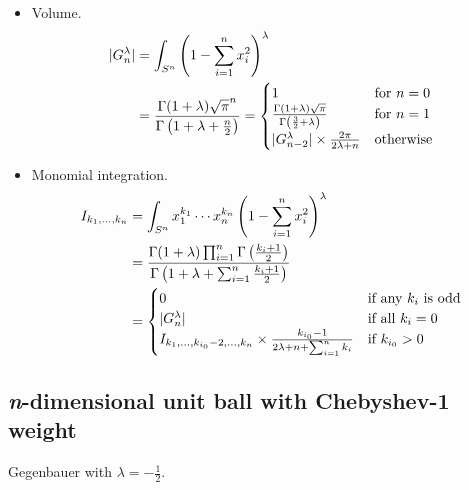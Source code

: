 \documentclass[draft]{scrartcl}
\begin{document}
\begin{itemize}
  \item Volume.
    \begin{align}\nonumber
    |G_n^{\lambda}|
      &= \int_{S^n} \left(1 - \sum_{i=1}^n x_i^2\right)^\lambda\\
      &= \frac{%
        \Gamma(1+\lambda)\sqrt{\pi}^n
      }{%
        \Gamma\left(1+\lambda + \frac{n}{2}\right)
      }
      = \begin{cases}
        1&\text{for $n=0$}\\
        \frac{\Gamma(1+\lambda)\sqrt{\pi}}{\Gamma\left(\frac{3}{2} + \lambda\right)}&\text{for $n=1$}\\
        |G_{n-2}^{\lambda}|\times \frac{2\pi}{2\lambda + n}&\text{otherwise}
      \end{cases}
  \end{align}

  \item Monomial integration.
  \begin{align}\nonumber
    I_{k_1,\dots,k_n}
      &= \int_{S^n} x_1^{k_1}\cdots x_n^{k_n} \left(1 - \sum_{i=1}^n
      x_i^2\right)^\lambda\\
      &= \frac{%
        \Gamma(1+\lambda)\prod_{i=1}^n \Gamma\left(\frac{k_i+1}{2}\right)
      }{%
        \Gamma\left(1+\lambda + \sum_{i=1}^n \frac{k_i+1}{2}\right)
      }\\
      &= \begin{cases}
        0&\text{if any $k_i$ is odd}\\
        |G_n^{\lambda}|&\text{if all $k_i=0$}\\
        I_{k_1,\dots,k_{i_0}-2,\dots,k_n} \times \frac{k_{i_0}-1}{2\lambda + n + \sum_{i=1}^n k_i}&\text{if $k_{i_0} > 0$}
      \end{cases}
  \end{align}
\end{itemize}


\subsection*{\textit{n}-dimensional unit ball with Chebyshev-1 weight}

Gegenbauer with $\lambda=-\frac{1}{2}$.
\end{document}
